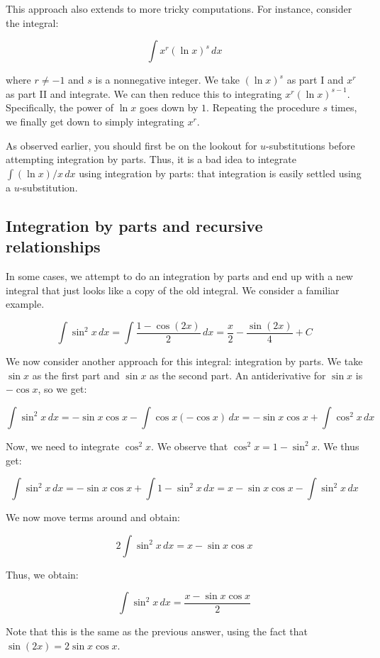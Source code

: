 \documentclass{amsart}
\begin{document}
This approach also extends to more tricky computations. For instance,
consider the integral:

$$\int x^r(\ln x)^s \, dx$$

where $r \ne -1$ and $s$ is a nonnegative integer. We take $(\ln x)^s$
as part I and $x^r$ as part II and integrate. We can then reduce this
to integrating $x^r (\ln x)^{s - 1}$. Specifically, the power of $\ln
x$ goes down by $1$. Repeating the procedure $s$ times, we finally get
down to simply integrating $x^r$.

As observed earlier, you should first be on the
lookout for $u$-substitutions before attempting integration by
parts. Thus, it is a bad idea to integrate $\int (\ln x)/x \, dx$
using integration by parts: that integration is easily settled using a
$u$-substitution.

\subsection{Integration by parts and recursive relationships}

In some cases, we attempt to do an integration by parts and end up
with a new integral that just looks like a copy of the old
integral. We consider a familiar example.

$$\int \sin^2 x \, dx = \int \frac{1 - \cos(2x)}{2} \, dx = \frac{x}{2} - \frac{\sin(2x)}{4} + C$$

We now consider another approach for this integral: integration by
parts. We take $\sin x$ as the first part and $\sin x$ as the second
part. An antiderivative for $\sin x$ is $-\cos x$, so we get:

$$\int \sin^2 x \, dx = -\sin x \cos x - \int \cos x(- \cos x) \, dx = -\sin x \cos x + \int \cos^2x \, dx$$

Now, we need to integrate $\cos^2 x$. We observe that $\cos^2 x = 1 -
\sin^2 x$. We thus get:

$$\int \sin^2 x \, dx = -\sin x \cos x + \int 1 - \sin^2 x \, dx = x - \sin x \cos x - \int \sin^2 x\, dx$$

We now move terms around and obtain:

$$2 \int \sin^2 x \, dx = x - \sin x \cos x$$

Thus, we obtain:

$$\int \sin^2 x \, dx = \frac{x - \sin x \cos x}{2}$$

Note that this is the same as the previous answer, using the fact that
$\sin(2x) = 2\sin x \cos x$.
\end{document}
